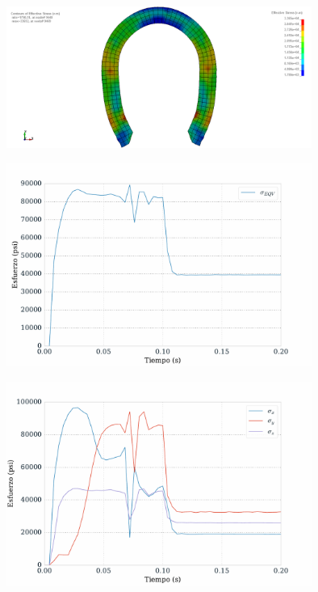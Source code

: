 \begin{center}
\includegraphics[width=0.75\textwidth]{src/ch4/von_mises_01.png}
\label{fig:von_mises_01}
\end{center}

\begin{center}
\includegraphics[width=0.75\textwidth]{src/ch4/von_mises_stress_01.pdf}
\label{fig:von_mises_stress_01}
\end{center}

\begin{center}
\includegraphics[width=0.75\textwidth]{src/ch4/xyz_stress_01.pdf}
\label{fig:xyz_stress_01}
\end{center}



